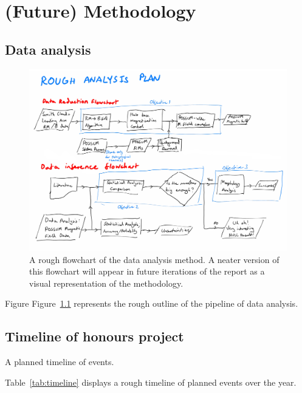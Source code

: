 \chapter{(Future) Methodology}
\label{cha:methodology}

\section{Data analysis}
\label{sec:method}

\begin{figure}[h]
  \label{fig:flowchart}
  \includegraphics[width=\columnwidth]{figs/flowchart.png}
  \caption{A rough flowchart of the data analysis method. A neater version of this flowchart will appear in future iterations of the report as a visual representation of the methodology.}
\end{figure}

Figure Figure~\ref{fig:flowchart} represents the rough outline of the pipeline of data analysis.

\section{Timeline of honours project}
\label{sec:timeline}

\begin{table}[h]
  \centering
  
  \caption{A planned timeline of events.}
  \label{tab:timeline}
\end{table}

Table~\ref{tab:timeline} displays a rough timeline of planned events over the year.


